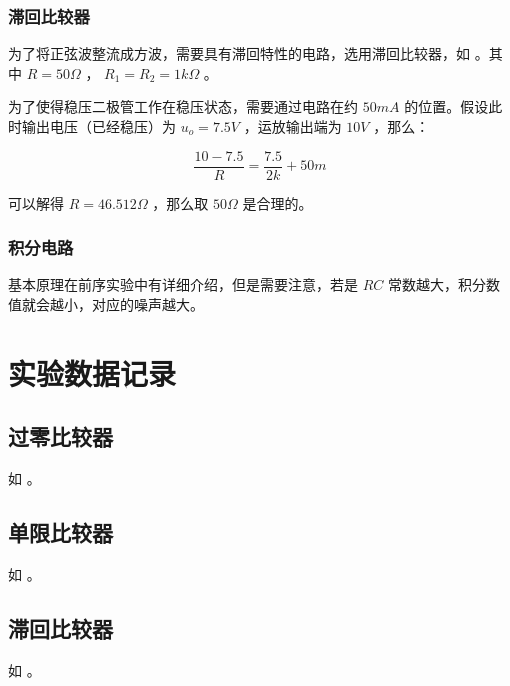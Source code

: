 \documentclass[lang=cn,11pt,a4paper,cite=authoryear]{elegantpaper}
\begin{document}

\subsubsection{滞回比较器}

为了将正弦波整流成方波，需要具有滞回特性的电路，选用滞回比较器，如  。其中 \(R = 50 \Omega\) ， \(R_1 = R_2 = 1 k\Omega\) 。

为了使得稳压二极管工作在稳压状态，需要通过电路在约 \(50 mA\) 的位置。假设此时输出电压（已经稳压）为 \(u_o = 7.5 V\) ，运放输出端为 \(10 V\) ，那么：

\[\frac{10 - 7.5}{R} = \frac{7.5}{2 k} + 50 m\]

可以解得 \(R = 46.512 \Omega\) ，那么取 \(50 \Omega\) 是合理的。


\subsubsection{积分电路} 

基本原理在前序实验中有详细介绍，但是需要注意，若是 \(R C\) 常数越大，积分数值就会越小，对应的噪声越大。

\section{实验数据记录}

\subsection{过零比较器}

如  。


\subsection{单限比较器}

如  。


\subsection{滞回比较器}

如  。

\end{document}
